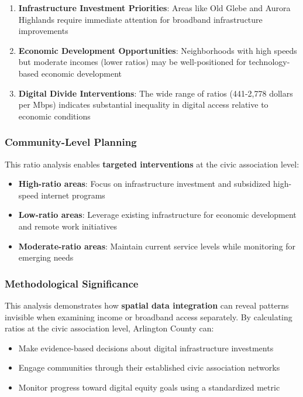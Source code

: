 \documentclass[
  letterpaper,
  DIV=11,
  numbers=noendperiod]{scrartcl}
\providecommand{\tightlist}{%
  \setlength{\itemsep}{0pt}\setlength{\parskip}{0pt}}
\begin{document}
\begin{enumerate}
\def\labelenumi{\arabic{enumi}.}
\tightlist
\item
  \textbf{Infrastructure Investment Priorities}: Areas like Old Glebe
  and Aurora Highlands require immediate attention for broadband
  infrastructure improvements
\item
  \textbf{Economic Development Opportunities}: Neighborhoods with high
  speeds but moderate incomes (lower ratios) may be well-positioned for
  technology-based economic development
\item
  \textbf{Digital Divide Interventions}: The wide range of ratios
  (441-2,778 dollars per Mbps) indicates substantial inequality in
  digital access relative to economic conditions
\end{enumerate}

\subsubsection{Community-Level Planning}\label{community-level-planning}

This ratio analysis enables \textbf{targeted interventions} at the civic
association level:

\begin{itemize}
\tightlist
\item
  \textbf{High-ratio areas}: Focus on infrastructure investment and
  subsidized high-speed internet programs
\item
  \textbf{Low-ratio areas}: Leverage existing infrastructure for
  economic development and remote work initiatives\\
\item
  \textbf{Moderate-ratio areas}: Maintain current service levels while
  monitoring for emerging needs
\end{itemize}

\subsubsection{Methodological
Significance}\label{methodological-significance}

This analysis demonstrates how \textbf{spatial data integration} can
reveal patterns invisible when examining income or broadband access
separately. By calculating ratios at the civic association level,
Arlington County can:

\begin{itemize}
\tightlist
\item
  Make evidence-based decisions about digital infrastructure investments
\item
  Engage communities through their established civic association
  networks
\item
  Monitor progress toward digital equity goals using a standardized
  metric
\end{itemize}
\end{document}
